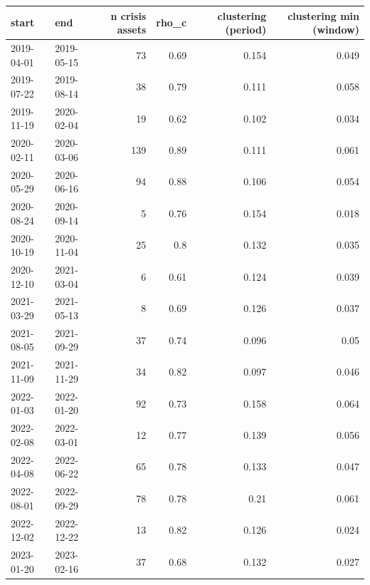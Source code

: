 \begin{tabular}{llrrrr}
\toprule
start & end & n crisis assets & rho\_c & clustering (period) & clustering min (window) \\
\midrule
2019-04-01 & 2019-05-15 & 73 & 0.69 & 0.154 & 0.049 \\
2019-07-22 & 2019-08-14 & 38 & 0.79 & 0.111 & 0.058 \\
2019-11-19 & 2020-02-04 & 19 & 0.62 & 0.102 & 0.034 \\
2020-02-11 & 2020-03-06 & 139 & 0.89 & 0.111 & 0.061 \\
2020-05-29 & 2020-06-16 & 94 & 0.88 & 0.106 & 0.054 \\
2020-08-24 & 2020-09-14 & 5 & 0.76 & 0.154 & 0.018 \\
2020-10-19 & 2020-11-04 & 25 & 0.8 & 0.132 & 0.035 \\
2020-12-10 & 2021-03-04 & 6 & 0.61 & 0.124 & 0.039 \\
2021-03-29 & 2021-05-13 & 8 & 0.69 & 0.126 & 0.037 \\
2021-08-05 & 2021-09-29 & 37 & 0.74 & 0.096 & 0.05 \\
2021-11-09 & 2021-11-29 & 34 & 0.82 & 0.097 & 0.046 \\
2022-01-03 & 2022-01-20 & 92 & 0.73 & 0.158 & 0.064 \\
2022-02-08 & 2022-03-01 & 12 & 0.77 & 0.139 & 0.056 \\
2022-04-08 & 2022-06-22 & 65 & 0.78 & 0.133 & 0.047 \\
2022-08-01 & 2022-09-29 & 78 & 0.78 & 0.21 & 0.061 \\
2022-12-02 & 2022-12-22 & 13 & 0.82 & 0.126 & 0.024 \\
2023-01-20 & 2023-02-16 & 37 & 0.68 & 0.132 & 0.027 \\
\bottomrule
\end{tabular}
